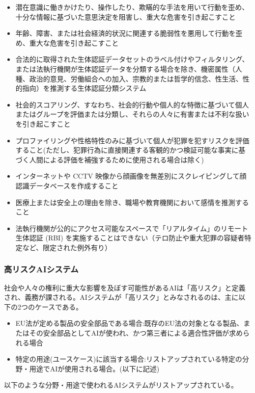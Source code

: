 \begin{itemize}
  \item 潜在意識に働きかけたり、操作したり、欺瞞的な手法を用いて行動を歪め、十分な情報に基づいた意思決定を阻害し、重大な危害を引き起こすこと
  \item 年齢、障害、または社会経済的状況に関連する脆弱性を悪用して行動を歪め、重大な危害を引き起こすこと
  \item 合法的に取得された生体認証データセットのラベル付けやフィルタリング、または法執行機関が生体認証データを分類する場合を除き、機密属性（人種、政治的意見、労働組合への加入、宗教的または哲学的信念、性生活、性的指向）を推測する生体認証分類システム
  \item 社会的スコアリング、すなわち、社会的行動や個人的な特徴に基づいて個人またはグループを評価または分類し、それらの人々に有害または不利な扱いを引き起こすこと
  \item プロファイリングや性格特性のみに基づいて個人が犯罪を犯すリスクを評価すること(ただし、犯罪行為に直接関連する客観的かつ検証可能な事実に基づく人間による評価を補強するために使用される場合は除く)
  \item インターネットや CCTV 映像から顔画像を無差別にスクレイピングして顔認識データベースを作成すること
  \item 医療上または安全上の理由を除き、職場や教育機関において感情を推測すること
  \item 法執行機関が公的にアクセス可能なスペースで「リアルタイム」のリモート生体認証 (RBI) を実施することはできない（テロ防止や重大犯罪の容疑者特定など、限定された例外有り）
\end{itemize}

\subsubsection{高リスクAIシステム}
社会や人々の権利に重大な影響を及ぼす可能性があるAIは「高リスク」と定義され、義務が課される。AIシステムが「高リスク」とみなされるのは、主に以下の2つのケースである。

\begin{itemize}
    \item EU法が定める製品の安全部品である場合:既存のEU法の対象となる製品、またはその安全部品としてAIが使われ、かつ第三者による適合性評価が求められる場合
    \item 特定の用途(ユースケース)に該当する場合:リストアップされている特定の分野・用途でAIが使用される場合。(以下に記述)
\end{itemize}

以下のような分野・用途で使われるAIシステムがリストアップされている。


